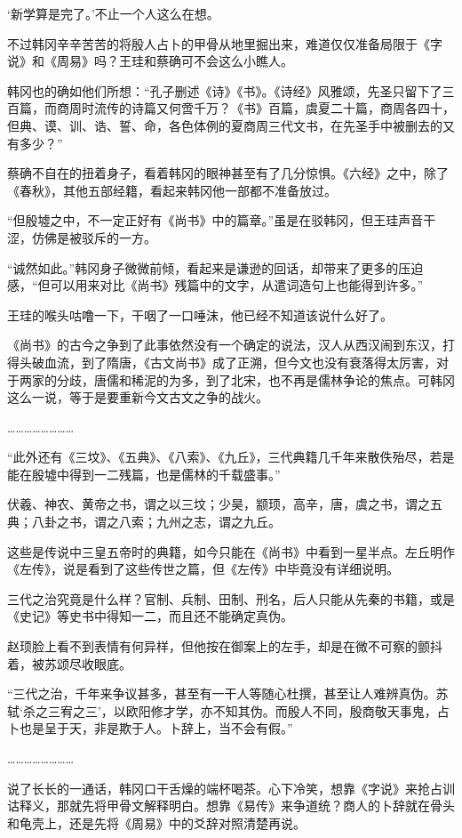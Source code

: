 ‘新学算是完了。’不止一个人这么在想。

不过韩冈辛辛苦苦的将殷人占卜的甲骨从地里掘出来，难道仅仅准备局限于《字说》和《周易》吗？王珪和蔡确可不会这么小瞧人。

韩冈也的确如他们所想：“孔子删述《诗》《书》。《诗经》风雅颂，先圣只留下了三百篇，而商周时流传的诗篇又何啻千万？《书》百篇，虞夏二十篇，商周各四十，但典、谟、训、诰、誓、命，各色体例的夏商周三代文书，在先圣手中被删去的又有多少？”

蔡确不自在的扭着身子，看着韩冈的眼神甚至有了几分惊惧。《六经》之中，除了《春秋》，其他五部经籍，看起来韩冈他一部都不准备放过。

“但殷墟之中，不一定正好有《尚书》中的篇章。”虽是在驳韩冈，但王珪声音干涩，仿佛是被驳斥的一方。

“诚然如此。”韩冈身子微微前倾，看起来是谦逊的回话，却带来了更多的压迫感，“但可以用来对比《尚书》残篇中的文字，从遣词造句上也能得到许多。”

王珪的喉头咕噜一下，干咽了一口唾沫，他已经不知道该说什么好了。

《尚书》的古今之争到了此事依然没有一个确定的说法，汉人从西汉闹到东汉，打得头破血流，到了隋唐，《古文尚书》成了正溯，但今文也没有衰落得太厉害，对于两家的分歧，唐儒和稀泥的为多，到了北宋，也不再是儒林争论的焦点。可韩冈这么一说，等于是要重新今文古文之争的战火。

……………………

“此外还有《三坟》、《五典》、《八索》、《九丘》，三代典籍几千年来散佚殆尽，若是能在殷墟中得到一二残篇，也是儒林的千载盛事。”

伏羲、神农、黄帝之书，谓之以三坟；少昊，颛顼，高辛，唐，虞之书，谓之五典；八卦之书，谓之八索；九州之志，谓之九丘。

这些是传说中三皇五帝时的典籍，如今只能在《尚书》中看到一星半点。左丘明作《左传》，说是看到了这些传世之篇，但《左传》中毕竟没有详细说明。

三代之治究竟是什么样？官制、兵制、田制、刑名，后人只能从先秦的书籍，或是《史记》等史书中得知一二，而且还不能确定真伪。

赵顼脸上看不到表情有何异样，但他按在御案上的左手，却是在微不可察的颤抖着，被苏颂尽收眼底。

“三代之治，千年来争议甚多，甚至有一干人等随心杜撰，甚至让人难辨真伪。苏轼‘杀之三宥之三’，以欧阳修才学，亦不知其伪。而殷人不同，殷商敬天事鬼，占卜也是呈于天，非是欺于人。卜辞上，当不会有假。”

……………………

说了长长的一通话，韩冈口干舌燥的端杯喝茶。心下冷笑，想靠《字说》来抢占训诂释义，那就先将甲骨文解释明白。想靠《易传》来争道统？商人的卜辞就在骨头和龟壳上，还是先将《周易》中的爻辞对照清楚再说。

